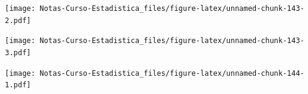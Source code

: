 \documentclass[
  12pt,
]{book}
\newenvironment{Shaded}{\begin{snugshade}}{\end{snugshade}}
\newcommand{\DataTypeTok}[1]{\textcolor[rgb]{0.13,0.29,0.53}{#1}}
\newcommand{\DecValTok}[1]{\textcolor[rgb]{0.00,0.00,0.81}{#1}}
\newcommand{\FloatTok}[1]{\textcolor[rgb]{0.00,0.00,0.81}{#1}}
\newcommand{\KeywordTok}[1]{\textcolor[rgb]{0.13,0.29,0.53}{\textbf{#1}}}
\newcommand{\NormalTok}[1]{#1}
\newcommand{\OperatorTok}[1]{\textcolor[rgb]{0.81,0.36,0.00}{\textbf{#1}}}
\newcommand{\StringTok}[1]{\textcolor[rgb]{0.31,0.60,0.02}{#1}}
\theoremstyle{definition}
\theoremstyle{definition}
\theoremstyle{definition}
\theoremstyle{remark}
\begin{document}
\texttt{[image: Notas-Curso-Estadistica\_files/figure-latex/unnamed-chunk-143-2.pdf]}

\begin{Shaded}
\end{Shaded}

\texttt{[image: Notas-Curso-Estadistica\_files/figure-latex/unnamed-chunk-143-3.pdf]}

\begin{Shaded}
\end{Shaded}

\texttt{[image: Notas-Curso-Estadistica\_files/figure-latex/unnamed-chunk-144-1.pdf]}
\end{document}
